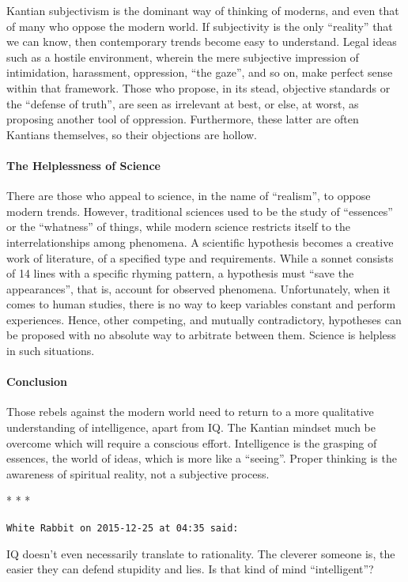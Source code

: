 Kantian subjectivism is the dominant way of thinking of moderns, and even that of many who oppose the modern world. If subjectivity is the only ``reality'' that we can know, then contemporary trends become easy to understand. Legal ideas such as a hostile environment, wherein the mere subjective impression of intimidation, harassment, oppression, ``the gaze'', and so on, make perfect sense within that framework. Those who propose, in its stead, objective standards or the ``defense of truth'', are seen as irrelevant at best, or else, at worst, as proposing another tool of oppression. Furthermore, these latter are often Kantians themselves, so their objections are hollow.

\paragraph{The Helplessness of Science}


There are those who appeal to science, in the name of ``realism'', to oppose modern trends. However, traditional sciences used to be the study of ``essences'' or the ``whatness'' of things, while modern science restricts itself to the interrelationships among phenomena. A scientific hypothesis becomes a creative work of literature, of a specified type and requirements. While a sonnet consists of 14 lines with a specific rhyming pattern, a hypothesis must ``save the appearances'', that is, account for observed phenomena. Unfortunately, when it comes to human studies, there is no way to keep variables constant and perform experiences. Hence, other competing, and mutually contradictory, hypotheses can be proposed with no absolute way to arbitrate between them. Science is helpless in such situations.

\paragraph{Conclusion}


Those rebels against the modern world need to return to a more qualitative understanding of intelligence, apart from IQ. The Kantian mindset much be overcome which will require a conscious effort. Intelligence is the grasping of essences, the world of ideas, which is more like a ``seeing''. Proper thinking is the awareness of spiritual reality, not a subjective process.



\begin{center}* * *\end{center}

\begin{footnotesize}
\begin{sffamily}
\texttt{White Rabbit on 2015-12-25 at 04:35 said:}

IQ doesn't even necessarily translate to rationality. The cleverer someone is, the easier they can defend stupidity and lies. Is that kind of mind ``intelligent''?

\end{sffamily}
\end{footnotesize}

